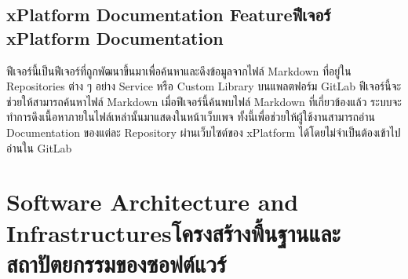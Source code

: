 \subsection{\ifenglish xPlatform Documentation Feature\else ฟีเจอร์ xPlatform Documentation \fi}
ฟีเจอร์นี้เป็นฟีเจอร์ที่ถูกพัฒนาขึ้นมาเพื่อค้นหาและดึงข้อมูลจากไฟล์ Markdown ที่อยู่ใน Repositories ต่าง ๆ อย่าง  Service หรือ Custom Library บนแพลตฟอร์ม GitLab ฟีเจอร์นี้จะช่วยให้สามารถค้นหาไฟล์ Markdown เมื่อฟีเจอร์นี้ค้นพบไฟล์ Markdown ที่เกี่ยวข้องแล้ว ระบบจะทำการดึงเนื้อหาภายในไฟล์เหล่านั้นมาแสดงในหน้าเว็บเพจ ทั้งนี้เพื่อช่วยให้ผู้ใช้งานสามารถอ่าน Documentation ของแต่ละ Repository ผ่านเว็บไซต์ของ xPlatform ได้โดยไม่จำเป็นต้องเข้าไปอ่านใน GitLab

\section{\ifenglish Software Architecture and Infrastructures\else โครงสร้างพื้นฐานและสถาปัตยกรรมของซอฟต์แวร์ \fi}
